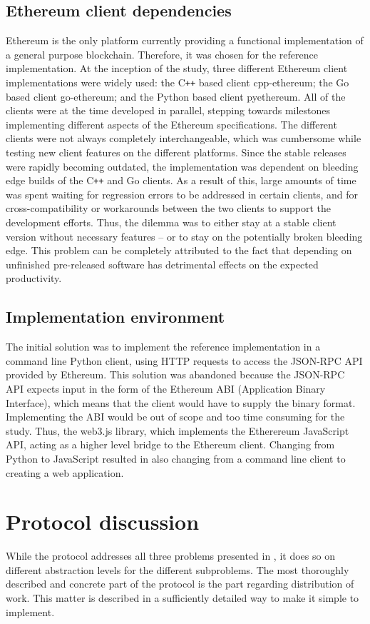 \subsection{Ethereum client dependencies}
Ethereum is the only platform currently providing a functional implementation of a general purpose blockchain. Therefore, it was chosen  for the reference implementation. At the inception of the study, three different Ethereum client implementations were widely used: the C\texttt{++} based client cpp-ethereum; the Go based client go-ethereum; and the Python based client pyethereum. All of the clients were at the time developed in parallel, stepping towards milestones implementing different aspects of the Ethereum specifications. The different clients were not always completely interchangeable, which was cumbersome while testing new client features on the different platforms. Since the stable releases were rapidly becoming outdated, the implementation was dependent on bleeding edge builds of the C\texttt{++} and Go clients. As a result of this, large amounts of time was spent waiting for regression errors to be addressed in certain clients, and for cross-compatibility or workarounds between the two clients to support the development efforts. Thus, the dilemma was to either stay at a stable client version without necessary features -- or to stay on the potentially broken bleeding edge. This problem can be completely attributed to the fact that depending on unfinished pre-released software has detrimental effects on the expected productivity.

\subsection{Implementation environment}
The initial solution was to implement the reference implementation in a command line Python client, using HTTP requests to access the JSON-RPC API provided by Ethereum. This solution was abandoned because the JSON-RPC API expects input in the form of the Ethereum ABI (Application Binary Interface), which means that the client would have to supply the binary format. Implementing the ABI would be out of scope and too time consuming for the study. Thus, the web3.js library, which implements the Etherereum JavaScript API, acting as a higher level bridge to the Ethereum client. Changing from Python to JavaScript resulted in also changing from a command line client to creating a web application.

\section{Protocol discussion}
While the protocol addresses all three problems presented in , it does so on different abstraction levels for the different subproblems. The most thoroughly described and concrete part of the protocol is the part regarding distribution of work. This matter is described in a sufficiently detailed way to make it simple to implement.

